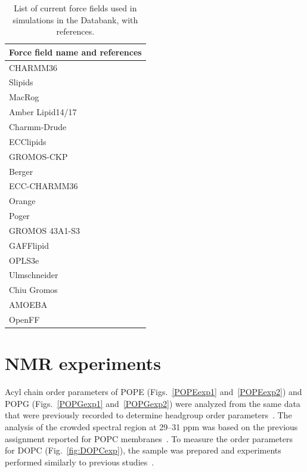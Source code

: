 \documentclass[fleqn,10pt]{wlscirepSI}
\begin{document}
\begin{table}[p]
    \centering
    \begin{tabular}{l}
    Force field name and references \\
    \hline
    CHARMM36~\cite{klauda10}\\
    Slipids~\cite{jambeck12,jambeck12b,jambeck2012another,ermilova16,grote20}  \\
    MacRog~\cite{Kulig15b}  \\
    Amber Lipid14/17~\cite{dickson14,dickson22}  \\
    Charmm-Drude~\cite{li2017drude}      \\
    ECClipids~\cite{melcr18,melcr20,bacle21}  \\
    GROMOS-CKP~\cite{Chandrasekhar03,kukol09,piggot12}  \\
    Berger~\cite{berger97}  \\
    ECC-CHARMM36~\cite{nencini2019development}  \\
    Orange~\cite{catte16}  \\
    Poger~\cite{poger10}  \\
    GROMOS 43A1-S3~\cite{chiu09}  \\ 
    GAFFlipid~\cite{dickson12}  \\
    OPLS3e~\cite{roos19}  \\
    Ulmschneider~\cite{Ulmschneider09}  \\
    Chiu Gromos~\cite{chiu09}  \\
    AMOEBA~\cite{chu2018polarizable} \\
    OpenFF
    \end{tabular}
    \caption{List of current force fields used in simulations in the Databank, with references.}
    \label{tab:ForceFields}
\end{table}



\clearpage
\section{NMR experiments}
Acyl chain order parameters of POPE (Figs.~\ref{POPEexp1} and~\ref{POPEexp2}) and POPG (Figs.~\ref{POPGexp1} and~\ref{POPGexp2}) were analyzed from the same data that were previously recorded to determine headgroup order parameters~\cite{bacle21}. The analysis of the crowded spectral region at 29--31 ppm was based on the previous assignment reported for POPC membranes~\cite{ferreira13}. To measure the order parameters for DOPC (Fig.~\ref{fig:DOPCexp}), the sample was prepared and experiments performed similarly to previous studies~\cite{bacle21}.
\end{document}
